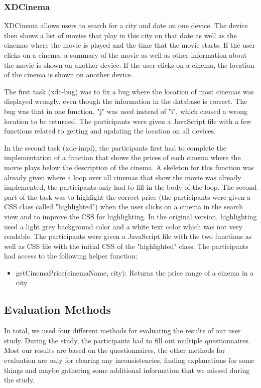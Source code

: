 \subsubsection{XDCinema}

XDCinema allows users to search for a city and date on one device. The device then shows a list of movies that play in this city on that date as well as the cinemas where the movie is played and the time that the movie starts. If the user clicks on a cinema, a summary of the movie as well as other information about the movie is shown on another device. If the user clicks on a cinema, the location of the cinema is shown on another device.

The first task (xdc-bug) was to fix a bug where the location of most cinemas was displayed wrongly, even though the information in the database is correct. The bug was that in one function, "j" was used instead of "i", which caused a wrong location to be returned. The participants were given a JavaScript file with a few functions related to getting and updating the location on all devices.

In the second task (xdc-impl), the participants first had to complete the implementation of a function that shows the prices of each cinema where the movie plays below the description of the cinema. A skeleton for this function was already given where a loop over all cinemas that show the movie was already implemented, the participants only had to fill in the body of the loop. The second part of the task was to highlight the correct price (the participants were given a CSS class called "highlighted") when the user clicks on a cinema in the search view and to improve the CSS for highlighting. In the original version, highlighting used a light grey background color and a white text color which was not very readable. The participants were given a JavaScript file with the two functions as well as CSS file with the initial CSS of the "highlighted" class. The participants had access to the following helper function:
\begin{itemize}
	\item getCinemaPrice(cinemaName, city): Returns the price range of a cinema in a city
\end{itemize}

\subsection{Evaluation Methods}

In total, we used four different methods for evaluating the results of our user study. During the study, the participants had to fill out multiple questionnaires. Most our results are based on the questionnaires, the other methods for evaluation are only for clearing any inconsistencies, finding explanations for some things and maybe gathering some additional information that we missed during the study.

